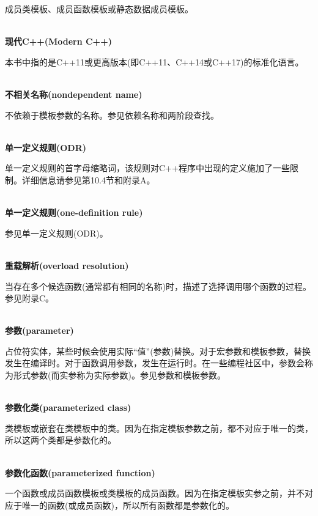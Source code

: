 成员类模板、成员函数模板或静态数据成员模板。

\hspace*{\fill} \\ %
\noindent
\textbf{现代C++(Modern C++)}

本书中指的是C++11或更高版本(即C++11、C++14或C++17)的标准化语言。

\hspace*{\fill} \\ %
\noindent
\textbf{不相关名称(nondependent name)}

不依赖于模板参数的名称。参见依赖名称和两阶段查找。

\hspace*{\fill} \\ %
\noindent
\textbf{单一定义规则(ODR)}

单一定义规则的首字母缩略词，该规则对C++程序中出现的定义施加了一些限制。详细信息请参见第10.4节和附录A。

\hspace*{\fill} \\ %
\noindent
\textbf{单一定义规则(one-definition rule)}

参见单一定义规则(ODR)。

\hspace*{\fill} \\ %
\noindent
\textbf{重载解析(overload resolution)}

当存在多个候选函数(通常都有相同的名称)时，描述了选择调用哪个函数的过程。参见附录C。

\hspace*{\fill} \\ %
\noindent
\textbf{参数(parameter)}

占位符实体，某些时候会使用实际“值”(参数)替换。对于宏参数和模板参数，替换发生在编译时。对于函数调用参数，发生在运行时。在一些编程社区中，参数会称为形式参数(而实参称为实际参数)。参见参数和模板参数。

\hspace*{\fill} \\ %
\noindent
\textbf{参数化类(parameterized class)}

类模板或嵌套在类模板中的类。因为在指定模板参数之前，都不对应于唯一的类，所以这两个类都是参数化的。

\hspace*{\fill} \\ %
\noindent
\textbf{参数化函数(parameterized function)}

一个函数或成员函数模板或类模板的成员函数。因为在指定模板实参之前，并不对应于唯一的函数(或成员函数)，所以所有函数都是参数化的。


